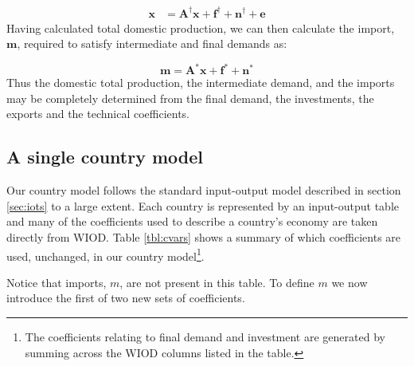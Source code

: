 \documentclass[a4paper]{article}
\begin{document}
\begin{align}
\boldsymbol{x}& = 
\boldsymbol{A^\dagger}\boldsymbol{x}
+ 
\boldsymbol{f^\dagger} + \boldsymbol{n^\dagger} + \boldsymbol{e} 
\label{eqn:xIRIO}
\end{align}
Having calculated total domestic production, we can then calculate the import, $\boldsymbol{m}$, required to satisfy intermediate and final demands as:

\begin{equation}\label{eqn:mIRIO}
\boldsymbol{m}
=
\boldsymbol{A^*}\boldsymbol{x}
+
\boldsymbol{f^*} + \boldsymbol{n^*} 
\end{equation}
Thus the domestic total production, the intermediate demand, and the imports may be completely determined from the final demand, the investments, the exports and the technical coefficients.

\subsection{A single country model}\label{sec:countries}
Our country model follows the standard input-output model described in section \ref{sec:iots} to a large extent.
Each country is represented by an input-output table and many of the coefficients used to describe a country's economy are taken directly from WIOD.
Table \ref{tbl:cvars} shows a summary of which coefficients are used, unchanged, in our country model\footnote{The coefficients relating to final demand and investment are generated by summing across the WIOD columns listed in the table.}.

Notice that imports, $m$, are not present in this table.
To define $m$ we now introduce the first of two new sets of coefficients. 
\end{document}
